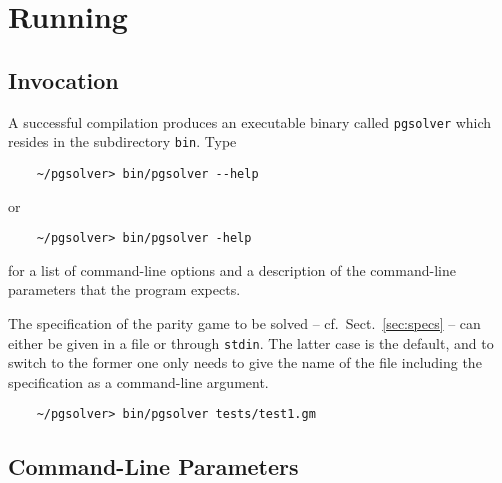 \section{Running \pgsolver}

\subsection{Invocation}

A successful compilation produces an executable binary called \texttt{pgsolver} which
resides in the subdirectory \texttt{bin}. Type
\begin{verbatim}
    ~/pgsolver> bin/pgsolver --help
\end{verbatim}
or
\begin{verbatim}
    ~/pgsolver> bin/pgsolver -help
\end{verbatim}
for a list of command-line options and a description of the command-line parameters that the
program expects.

The specification of the parity game to be solved -- cf.\ Sect.~\ref{sec:specs} -- can either be
given in a file or through \texttt{stdin}. The latter case is the default, and to switch to the
former one only needs to give the name of the file including the specification as a command-line
argument.
\begin{verbatim}
    ~/pgsolver> bin/pgsolver tests/test1.gm
\end{verbatim}

\subsection{Command-Line Parameters}

